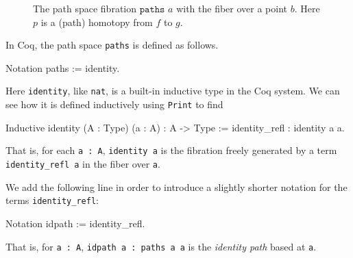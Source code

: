 \begin{figure}[H]
 \label{fig:paths}
  \caption{The path space fibration $\texttt{paths }a$ with the fiber
    over a point $b$.  Here $p$ is a (path) homotopy from $f$ to $g$.}
\end{figure}
In Coq, the path space \verb|paths| is defined as follows.
\begin{center}
\begin{coqcode}
Notation paths := identity.
\end{coqcode}
\end{center}
Here \verb|identity|, like \verb|nat|, is a built-in
inductive type in the Coq system.  We can see how it is defined
inductively using \verb|Print| to find
\begin{center}
  \begin{coqcode}
Inductive identity (A : Type) (a : A) : A -> Type :=
 identity_refl : identity a a.
  \end{coqcode}
\end{center}
That is, for each \verb|a : A|, \verb|identity a| is the
fibration freely generated by a term \verb|identity_refl a| in
the fiber over \verb|a|.  

We add the following line in order to introduce a
slightly shorter notation for the terms \verb|identity_refl|:
\begin{center}
  \begin{coqcode}
Notation idpath := identity_refl.
  \end{coqcode}
\end{center}
That is, for \verb|a : A|, \verb|idpath a : paths a a| is
the \emph{identity path} based at \verb|a|.

